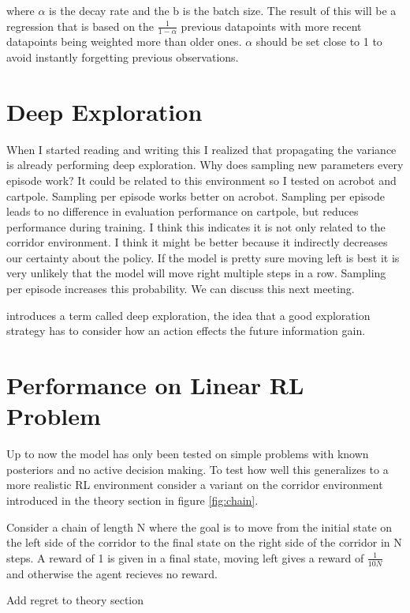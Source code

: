 where $\alpha$ is the decay rate and the b is the batch size. The result of this will be a regression that is based on the $\frac{1}{1-\alpha}$ previous datapoints with more recent datapoints being weighted more than older ones.  $\alpha$ should be set close to 1 to avoid instantly forgetting previous observations.

\section{Deep Exploration}

\todo When I started reading and writing this I realized that propagating the variance is already performing deep exploration. Why does sampling new parameters every episode work? It could be related to this environment so I tested on acrobot and cartpole. Sampling per episode works better on acrobot. Sampling per episode leads to no difference in evaluation performance on cartpole, but reduces performance during training. I think this indicates it is not only related to the corridor environment. I think it might be better because it indirectly decreases our certainty about the policy. If the model is pretty sure moving left is best it is very unlikely that the model will move right multiple steps in a row. Sampling per episode increases this probability. We can discuss this next meeting.

\cite{osband_2018} introduces a term called deep exploration, the idea that a good exploration strategy has to consider how an action effects the future information gain.

\section{Performance on Linear RL Problem}

Up to now the model has only been tested on simple problems with known posteriors and no active decision making. To test how well this generalizes to a more realistic RL environment consider a variant on the corridor environment introduced in the theory section in figure \ref{fig:chain}.

Consider a chain of length N where the goal is to move from the initial state on the left side of the corridor to the final state on the right side of the corridor in N steps. A reward of 1 is given in a final state, moving left gives a reward of $\frac{1}{10N}$ and otherwise the agent recieves no reward.

\todo Add regret to theory section

